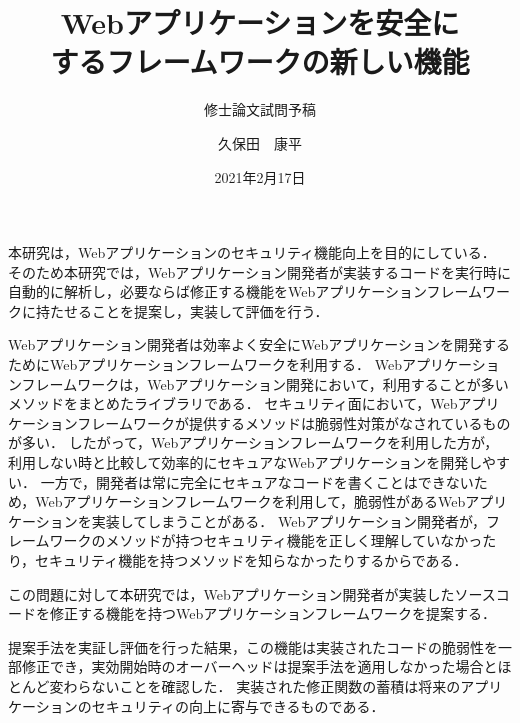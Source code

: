\documentclass[a4j,11pt]{jreport}
\title{Webアプリケーションを安全に\\するフレームワークの新しい機能}
\subtitle{修士論文試問予稿}
\author{久保田　康平}
\date{2021年2月17日}
\begin{document}
\maketitle

本研究は，Webアプリケーションのセキュリティ機能向上を目的にしている．
そのため本研究では，Webアプリケーション開発者が実装するコードを実行時に自動的に解析し，必要ならば修正する機能をWebアプリケーションフレームワークに持たせることを提案し，実装して評価を行う．

Webアプリケーション開発者は効率よく安全にWebアプリケーションを開発するためにWebアプリケーションフレームワークを利用する．
Webアプリケーションフレームワークは，Webアプリケーション開発において，利用することが多いメソッドをまとめたライブラリである．
セキュリティ面において，Webアプリケーションフレームワークが提供するメソッドは脆弱性対策がなされているものが多い．
したがって，Webアプリケーションフレームワークを利用した方が，利用しない時と比較して効率的にセキュアなWebアプリケーションを開発しやすい．
一方で，開発者は常に完全にセキュアなコードを書くことはできないため，Webアプリケーションフレームワークを利用して，脆弱性があるWebアプリケーションを実装してしまうことがある．
Webアプリケーション開発者が，フレームワークのメソッドが持つセキュリティ機能を正しく理解していなかったり，セキュリティ機能を持つメソッドを知らなかったりするからである．

この問題に対して本研究では，Webアプリケーション開発者が実装したソースコードを修正する機能を持つWebアプリケーションフレームワークを提案する．

提案手法を実証し評価を行った結果，この機能は実装されたコードの脆弱性を一部修正でき，実効開始時のオーバーヘッドは提案手法を適用しなかった場合とほとんど変わらないことを確認した．
実装された修正関数の蓄積は将来のアプリケーションのセキュリティの向上に寄与できるものである．

\preseninfo
\end{document}
